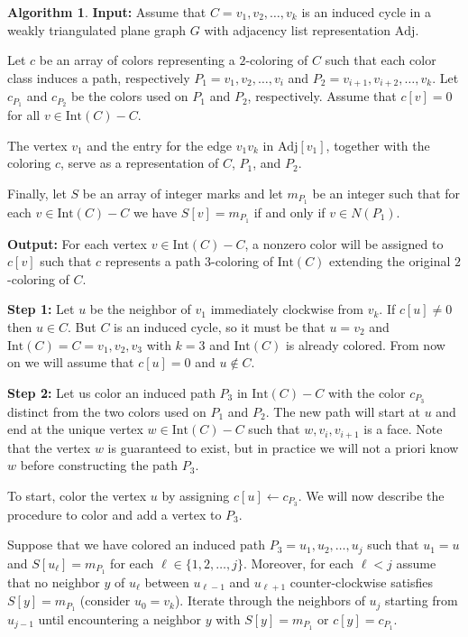 \documentclass[12pt,letterpaper]{article}
\theoremstyle{plain}
\theoremstyle{definition}
\theoremstyle{break}
\newtheorem{algorithm}[lemma]{Algorithm}     %
\begin{document}
\begin{algorithm}\label{A:poh_linear}
\textbf{Input:} Assume that $C=v_1,v_2,\ldots,v_k$ is an induced cycle in a weakly
triangulated plane
    graph $G$ with adjacency list representation $\text{Adj}$.

Let $c$ be an array of colors
representing a $2$-coloring of $C$ such
that each color class induces a path, respectively $P_1=v_1,v_2,\ldots,v_i$ and
$P_2=v_{i+1},v_{i+2},\ldots,v_k$. Let $c_{P_1}$ and $c_{P_2}$ be the colors
used on $P_1$ and $P_2$, respectively. Assume that $c[v]=0$ for all
$v\in\text{Int}(C)-C$.

The vertex $v_1$ and the
entry for the edge $v_1v_k$ in $\text{Adj}[v_1]$, together with the
coloring $c$, serve as a representation of $C$, $P_1$, and $P_2$.

Finally, let $S$ be an array of integer marks and let $m_{P_1}$ be an integer
such that for each $v\in\text{Int}(C)-C$ we have $S[v]=m_{P_1}$ if and only if
$v\in N(P_1)$.

\textbf{Output:} For each vertex $v\in\text{Int}(C)-C$, a nonzero color will be
assigned to $c[v]$ such that $c$ represents a path $3$-coloring of
$\text{Int}(C)$ extending the original $2$-coloring of $C$.

\textbf{Step 1:} Let $u$ be the neighbor of $v_1$ immediately clockwise from
$v_k$. If $c[u]\ne 0$ then $u\in C$. But $C$ is an induced cycle, so
it must be that $u=v_2$ and $\text{Int}(C)=C=v_1,v_2,v_3$ with $k=3$ and
$\text{Int}(C)$ is already colored. From now on we will assume that $c[u]=0$ and
$u\not\in C$.

\textbf{Step 2:} Let us color an induced path $P_3$ in $\text{Int}(C)-C$ with the
color $c_{P_3}$ distinct
from the two colors used on
$P_1$ and $P_2$. The new path will start at $u$ and end at the unique vertex
$w\in\text{Int}(C)-C$ such that $w,v_i,v_{i+1}$ is a face. Note that the vertex $w$ is
guaranteed to exist, but in practice we will not a priori
know $w$ before constructing the path $P_3$.

To start, color the vertex $u$ by assigning $c[u]\leftarrow c_{P_3}$. We will
now describe the procedure to color and add a vertex to $P_3$.

Suppose
that we have colored an induced path
$P_3=u_1,u_2,\ldots,u_j$ such that $u_1=u$ and $S[u_\ell]=m_{P_1}$ for each
$\ell\in\{1,2,\ldots,j\}$. Moreover, for each $\ell<j$ assume that no neighbor $y$ of $u_\ell$
between $u_{\ell-1}$ and $u_{\ell +1}$ counter-clockwise satisfies
$S[y]=m_{P_1}$ (consider $u_0=v_k$). Iterate through the neighbors of $u_j$ starting from $u_{j-1}$ until
encountering a neighbor $y$ with $S[y]=m_{P_1}$ or $c[y]=c_{P_1}$.


\end{algorithm}
\end{document}
